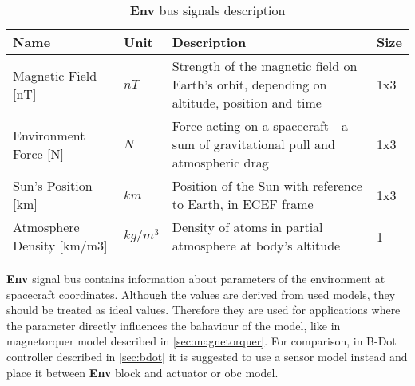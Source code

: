        
        \begin{table}[H]
            \begin{tabularx}{\textwidth}{llXl}
            \textbf{Name} & \textbf{Unit} & \textbf{Description} & \textbf{Size} \\[0.1cm] \hline \rule{0pt}{1.2\normalbaselineskip}
            Magnetic Field [nT] & $nT$ & Strength of the magnetic field on Earth's orbit, depending on altitude, position and time & 1x3 \\
            Environment Force [N]& $N$ & Force acting on a spacecraft - a sum of gravitational pull and atmospheric drag & 1x3 \\
            Sun's Position [km] & $km$ & Position of the Sun with reference to Earth, in ECEF frame & 1x3 \\
            Atmosphere Density [km/m3]& $kg/m^3$ & Density of atoms in partial atmosphere at body's altitude & 1
            \end{tabularx}
            \caption{\textbf{Env} bus signals description}
        \end{table}

        \textbf{Env} signal bus contains information about parameters of the environment at spacecraft coordinates. Although the values are derived from used models, they should be treated as ideal values. Therefore they are used for applications where the parameter directly influences the bahaviour of the model, like in magnetorquer model described in \autoref{sec:magnetorquer}. For comparison, in B-Dot controller described in \autoref{sec:bdot} it is suggested to use a sensor model instead and place it between \textbf{Env} block and actuator or \ac{obc} model.  